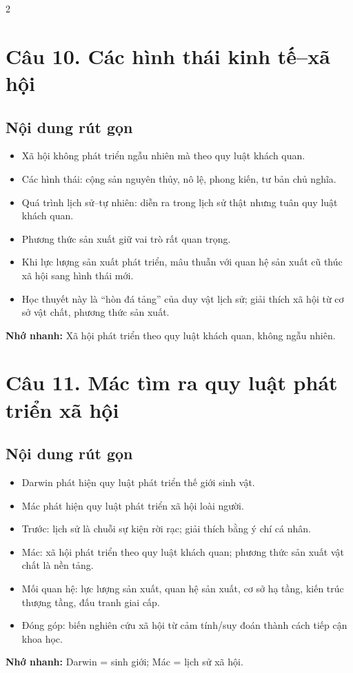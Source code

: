 \documentclass[9pt,a4paper]{extarticle}
\begin{document}
\begin{multicols*}{2}
\section*{Câu 10. Các hình thái kinh tế--xã hội}
\subsection*{Nội dung rút gọn}
\begin{itemize}
  \item Xã hội không phát triển ngẫu nhiên mà theo quy luật khách quan.
  \item Các hình thái: cộng sản nguyên thủy, nô lệ, phong kiến, tư bản chủ nghĩa.
  \item Quá trình lịch sử--tự nhiên: diễn ra trong lịch sử thật nhưng tuân quy luật khách quan.
  \item Phương thức sản xuất giữ vai trò rất quan trọng.
  \item Khi lực lượng sản xuất phát triển, mâu thuẫn với quan hệ sản xuất cũ thúc xã hội sang hình thái mới.
  \item Học thuyết này là ``hòn đá tảng'' của duy vật lịch sử; giải thích xã hội từ cơ sở vật chất, phương thức sản xuất.
\end{itemize}
\textbf{Nhớ nhanh:} Xã hội phát triển theo quy luật khách quan, không ngẫu nhiên.

\section*{Câu 11. Mác tìm ra quy luật phát triển xã hội}
\subsection*{Nội dung rút gọn}
\begin{itemize}
  \item Darwin phát hiện quy luật phát triển thế giới sinh vật.
  \item Mác phát hiện quy luật phát triển xã hội loài người.
  \item Trước: lịch sử là chuỗi sự kiện rời rạc; giải thích bằng ý chí cá nhân.
  \item Mác: xã hội phát triển theo quy luật khách quan; phương thức sản xuất vật chất là nền tảng.
  \item Mối quan hệ: lực lượng sản xuất, quan hệ sản xuất, cơ sở hạ tầng, kiến trúc thượng tầng, đấu tranh giai cấp.
  \item Đóng góp: biến nghiên cứu xã hội từ cảm tính/suy đoán thành cách tiếp cận khoa học.
\end{itemize}
\textbf{Nhớ nhanh:} Darwin = sinh giới; Mác = lịch sử xã hội.


\end{multicols*}
\end{document}
